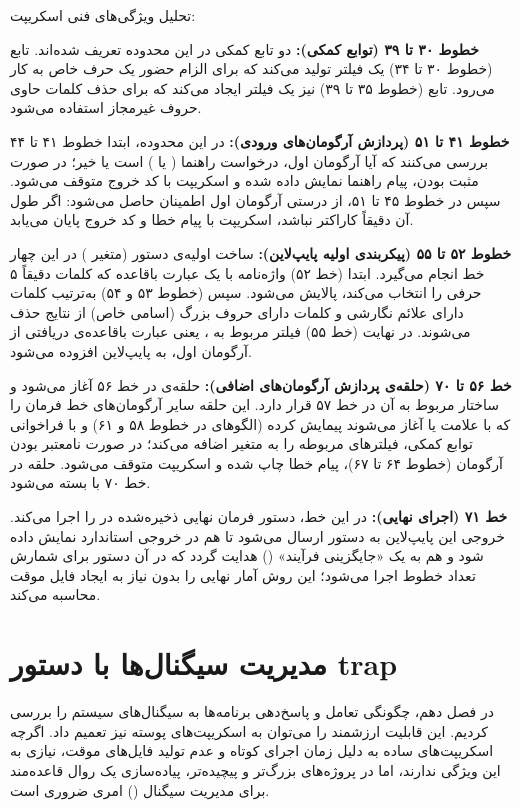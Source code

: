 تحلیل ویژگی‌های فنی اسکریپت:

\textbf{خطوط ۳۰ تا ۳۹ (توابع کمکی):} دو تابع کمکی در این محدوده تعریف شده‌اند. تابع  (خطوط ۳۰ تا ۳۴) یک فیلتر  تولید می‌کند که برای الزام حضور یک حرف خاص به کار می‌رود. تابع  (خطوط ۳۵ تا ۳۹) نیز یک فیلتر  ایجاد می‌کند که برای حذف کلمات حاوی حروف غیرمجاز استفاده می‌شود.

\textbf{خطوط ۴۱ تا ۵۱ (پردازش آرگومان‌های ورودی):} در این محدوده، ابتدا خطوط ۴۱ تا ۴۴ بررسی می‌کنند که آیا آرگومان اول، درخواست راهنما ( یا ) است یا خیر؛ در صورت مثبت بودن، پیام راهنما نمایش داده شده و اسکریپت با کد خروج  متوقف می‌شود. سپس در خطوط ۴۵ تا ۵۱، از درستی آرگومان اول اطمینان حاصل می‌شود: اگر طول آن دقیقاً  کاراکتر نباشد، اسکریپت با پیام خطا و کد خروج  پایان می‌یابد.

\textbf{خطوط ۵۲ تا ۵۵ (پیکربندی اولیه پایپ‌لاین):} ساخت اولیه‌ی دستور (متغیر ) در این چهار خط انجام می‌گیرد. ابتدا (خط ۵۲) واژه‌نامه با یک عبارت باقاعده که کلمات دقیقاً ۵ حرفی را انتخاب می‌کند، پالایش می‌شود. سپس (خطوط ۵۳ و ۵۴) به‌ترتیب کلمات دارای علائم نگارشی و کلمات دارای حروف بزرگ (اسامی خاص) از نتایج حذف می‌شوند. در نهایت (خط ۵۵) فیلتر مربوط به ، یعنی عبارت باقاعده‌ی دریافتی از آرگومان اول، به پایپ‌لاین افزوده می‌شود.

\textbf{خط ۵۶ تا ۷۰ (حلقه‌ی پردازش آرگومان‌های اضافی):} حلقه‌ی  در خط ۵۶ آغاز می‌شود و ساختار  مربوط به آن در خط ۵۷ قرار دارد. این حلقه سایر آرگومان‌های خط فرمان را که با علامت \cmd{+} یا \cmd{-} آغاز می‌شوند پیمایش کرده (الگوهای  در خطوط ۵۸ و ۶۱) و با فراخوانی توابع کمکی، فیلترهای مربوطه را به متغیر  اضافه می‌کند؛ در صورت نامعتبر بودن آرگومان (خطوط ۶۴ تا ۶۷)، پیام خطا چاپ شده و اسکریپت متوقف می‌شود. حلقه در خط ۷۰ با  بسته می‌شود.

\textbf{خط ۷۱ (اجرای نهایی):} در این خط، دستور  فرمان نهایی ذخیره‌شده در  را اجرا می‌کند. خروجی این پایپ‌لاین به دستور  ارسال می‌شود تا هم در خروجی استاندارد نمایش داده شود و هم به یک «جایگزینی فرآیند» () هدایت گردد که در آن دستور  برای شمارش تعداد خطوط اجرا می‌شود؛ این روش آمار نهایی را بدون نیاز به ایجاد فایل موقت محاسبه می‌کند.

\section{مدیریت سیگنال‌ها با دستور trap}

در فصل دهم، چگونگی تعامل و پاسخ‌دهی برنامه‌ها به سیگنال‌های سیستم را بررسی کردیم. این قابلیت ارزشمند را می‌توان به اسکریپت‌های پوسته نیز تعمیم داد. اگرچه اسکریپت‌های ساده به دلیل زمان اجرای کوتاه و عدم تولید فایل‌های موقت، نیازی به این ویژگی ندارند، اما در پروژه‌های بزرگ‌تر و پیچیده‌تر، پیاده‌سازی یک روال قاعده‌مند برای مدیریت سیگنال () امری ضروری است.

